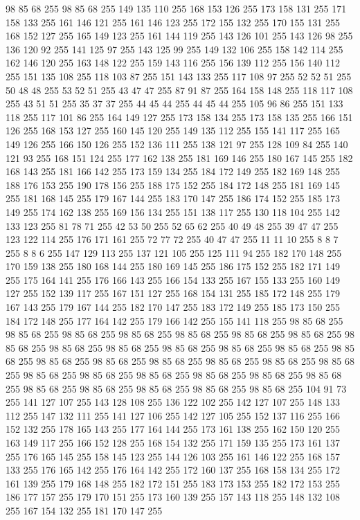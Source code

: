 98 85 68 255 98 85 68 255 149 135 110 255 168 153 126 255 173 158 131 255 171 158 133 255 161 146 121 255 161 146 123 255 172 155 132 255 170 155 131 255 168 152 127 255 165 149 123 255 161 144 119 255 143 126 101 255 143 126 98 255 136 120 92 255 141 125 97 255 143 125 99 255 149 132 106 255 158 142 114 255 162 146 120 255 163 148 122 255 159 143 116 255 156 139 112 255 156 140 112 255 151 135 108 255 118 103 87 255 151 143 133 255 117 108 97 255 52 52 51 255 50 48 48 255 53 52 51 255 43 47 47 255 87 91 87 255 164 158 148 255 118 117 108 255 43 51 51 255 35 37 37 255 44 45 44 255 44 45 44 255 105 96 86 255 151 133 118 255 117 101 86 255 164 149 127 255 173 158 134 255 173 158 135 255 166 151 126 255 168 153 127 255 160 145 120 255 149 135 112 255 155 141 117 255 165 149 126 255 166 150 126 255 152 136 111 255 138 121 97 255 128 109 84 255 140 121 93 255 168 151 124 255 177 162 138 255 181 169 146 255 180 167 145 255 182 168 143 255 181 166 142 255 173 159 134 255
184 172 149 255 182 169 148 255 188 176 153 255 190 178 156 255 188 175 152 255 184 172 148 255 181 169 145 255 181 168 145 255 179 167 144 255 183 170 147 255 186 174 152 255 185 173 149 255 174 162 138 255 169 156 134 255 151 138 117 255 130 118 104 255 142 133 123 255 81 78 71 255 42 53 50 255 52 65 62 255 40 49 48 255 39 47 47 255 123 122 114 255 176 171 161 255 72 77 72 255 40 47 47 255 11 11 10 255 8 8 7 255 8 8 6 255 147 129 113 255 137 121 105 255 125 111 94 255 182 170 148 255 170 159 138 255 180 168 144 255 180 169 145 255 186 175 152 255 182 171 149 255 175 164 141 255 176 166 143 255 166 154 133 255 167 155 133 255 160 149 127 255 152 139 117 255 167 151 127 255 168 154 131 255 185 172 148 255 179 167 143 255 179 167 144 255 182 170 147 255 183 172 149 255 185 173 150 255 184 172 148 255 177 164 142 255 179 166 142 255 155 141 118 255 98 85 68 255 98 85 68 255 98 85 68 255 98 85 68 255 98 85 68 255 98 85 68 255 98 85 68 255 98 85 68 255
98 85 68 255 98 85 68 255 98 85 68 255 98 85 68 255 98 85 68 255 98 85 68 255 98 85 68 255 98 85 68 255 98 85 68 255 98 85 68 255 98 85 68 255 98 85 68 255 98 85 68 255 98 85 68 255 98 85 68 255 98 85 68 255 98 85 68 255 98 85 68 255 98 85 68 255 98 85 68 255 98 85 68 255 98 85 68 255 98 85 68 255 104 91 73 255 141 127 107 255 143 128 108 255 136 122 102 255 142 127 107 255 148 133 112 255 147 132 111 255 141 127 106 255 142 127 105 255 152 137 116 255 166 152 132 255 178 165 143 255 177 164 144 255 173 161 138 255 162 150 120 255 163 149 117 255 166 152 128 255 168 154 132 255 171 159 135 255 173 161 137 255 176 165 145 255 158 145 123 255 144 126 103 255 161 146 122 255 168 157 133 255 176 165 142 255 176 164 142 255 172 160 137 255 168 158 134 255 172 161 139 255 179 168 148 255 182 172 151 255 183 173 153 255 182 172 153 255 186 177 157 255 179 170 151 255 173 160 139 255 157 143 118 255 148 132 108 255 167 154 132 255 181 170 147 255
